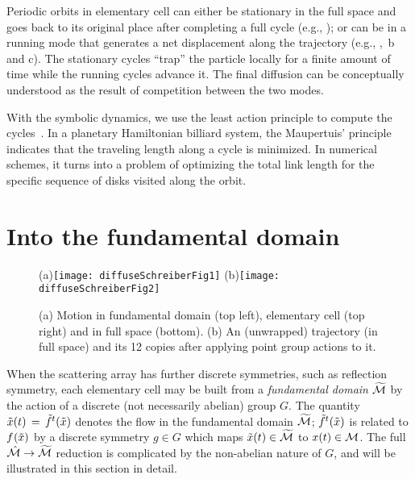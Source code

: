 \documentclass[aps,pre,
                showpacs,
                twocolumn,
                groupedaddress,
                floatfix]{revtex4-1}
\begin{document}
Periodic orbits in elementary cell can either be stationary in the full space
and goes back to its original place after completing a full cycle (e.g.,
); or can be in a running mode that generates a net displacement along
the trajectory (e.g., , \,b and c).
The stationary cycles ``trap'' the  particle locally for a finite amount of time
while the running cycles advance it. The final diffusion 
can be conceptually understood as the result of competition between the two 
modes.

With the symbolic dynamics, we use the least action principle to compute the 
cycles~. In a planetary Hamiltonian billiard system, the 
Maupertuis' principle indicates that the traveling length along a cycle is 
minimized. In numerical schemes, it turns into a problem of optimizing the 
total link length for the specific sequence of disks visited along the orbit. 


\section{Into the fundamental domain}
\label{s-SymmetryReduction}
\begin{figure}[htbp]
  \begin{center}
    (a)\texttt{[image: diffuseSchreiberFig1]}
    (b)\texttt{[image: diffuseSchreiberFig2]}
  \end{center}
  \caption[]{\label{fig-schrieberFig12} (a) Motion in fundamental domain (top 
  left), elementary cell (top right) and
  in full space (bottom). (b) An (unwrapped) trajectory (in full
  space) and its 12 copies after applying point group actions to it. 
  }
\end{figure}


When the scattering array has further discrete symmetries, such as reflection
symmetry, each elementary cell may be built from a {\em fundamental domain}
${\widetilde {{\cal M}}}$ by the action of a discrete (not necessarily abelian) group
$G$. The quantity $\tilde x(t)\,=\,{\tilde{f}^{t}(\tilde x)}$ denotes the flow in the
fundamental domain ${\widetilde {{\cal M}}}$; ${\tilde{f}^{t}(\tilde x)}$ is related to
${f^{}(\tilde x)}$ by a discrete symmetry $g \in G$ which maps $\tilde x(t)\in
{\widetilde {\ensuremath{{\cal M}}}}$ to ${x}(t) \in {\ensuremath{{\cal M}}}$. The full $\hat {{\cal M}} \rightarrow {\widetilde
{\ensuremath{{\cal M}}}}$ reduction is complicated by the non-abelian nature of $G$, and will be
illustrated in this section in detail.
\end{document}
